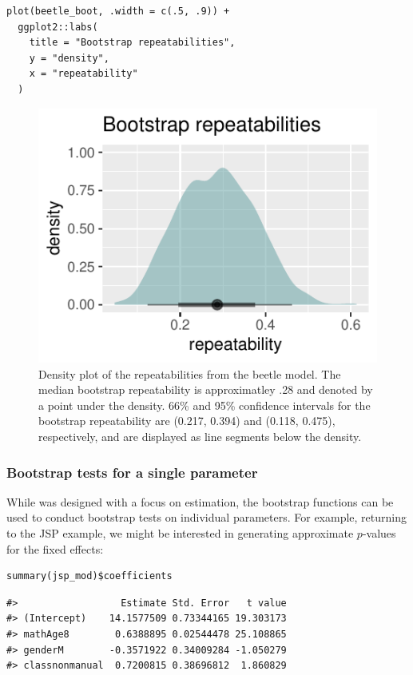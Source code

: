 \begin{verbatim}
plot(beetle_boot, .width = c(.5, .9)) + 
  ggplot2::labs(
    title = "Bootstrap repeatabilities",
    y = "density",
    x = "repeatability"
  )
\end{verbatim}

\begin{figure}

{\centering \includegraphics[width=0.4\linewidth]{RJ-2023-015_files/figure-latex/density-1} 

}

\caption{Density plot of the repeatabilities from the beetle model. The median bootstrap repeatability is approximatley .28 and denoted by a point under the density.  66\% and 95\% confidence intervals for the bootstrap repeatability are (0.217, 0.394) and (0.118, 0.475), respectively, and are displayed as line segments below the density.}\label{fig:density}
\end{figure}

\hypertarget{bootstrap-tests-for-a-single-parameter}{%
\subsubsection{Bootstrap tests for a single parameter}\label{bootstrap-tests-for-a-single-parameter}}

While  was designed with a focus on estimation, the
bootstrap functions can be used to conduct bootstrap tests on individual parameters. For example, returning to the JSP example, we might be interested in generating approximate \(p\)-values for the fixed effects:

\begin{verbatim}
summary(jsp_mod)$coefficients
\end{verbatim}

\begin{verbatim}
#>                  Estimate Std. Error   t value
#> (Intercept)    14.1577509 0.73344165 19.303173
#> mathAge8        0.6388895 0.02544478 25.108865
#> genderM        -0.3571922 0.34009284 -1.050279
#> classnonmanual  0.7200815 0.38696812  1.860829
\end{verbatim}

